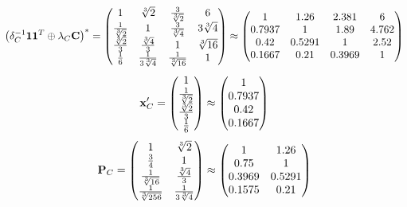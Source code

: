 \documentclass[10pt,a4paper]{article}
\begin{document}
	\[
		\left(\delta_{C}^{-1}\bold{11}^T \oplus \lambda_{C}\bold{C}\right)^* = 
		\begin{pmatrix}
			{1} {} & {\sqrt[3]{2}} {} & \frac{{3}} {\sqrt[3]{2}} & {{6}} {} \\
			\frac{1} {\sqrt[3]{2}} & {1} {} & \frac{{3}} {\sqrt[3]{4}} & {{3}\sqrt[3]{4}} {} \\
			\frac{\sqrt[3]{2}} {{3}} & \frac{\sqrt[3]{4}} {{3}} & {1} {} & {\sqrt[3]{16}} {} \\
			\frac{1} {{6}} & \frac{1} {{3}\sqrt[3]{4}} & \frac{1} {\sqrt[3]{16}} & {1} {} \\
		\end{pmatrix}
		\approx
		\begin{pmatrix}
			1        & 1.26     & 2.381    & 6        \\
			0.7937   & 1        & 1.89     & 4.762    \\
			0.42     & 0.5291   & 1        & 2.52     \\
			0.1667   & 0.21     & 0.3969   & 1        \\
		\end{pmatrix}
	\]
	\[
		\bold{x}'_{C} = 
		\begin{pmatrix}
			{1} {} \\
			\frac{1} {\sqrt[3]{2}} \\
			\frac{\sqrt[3]{2}} {{3}} \\
			\frac{1} {{6}} \\
		\end{pmatrix}
		\approx
		\begin{pmatrix}
			1        \\
			0.7937   \\
			0.42     \\
			0.1667   \\
		\end{pmatrix}
	\]
	\[
		\bold{P}_{C} = 
		\begin{pmatrix}
			{1} {} & {\sqrt[3]{2}} {} \\
			\frac{{3}} {{4}} & {1} {} \\
			\frac{1} {\sqrt[3]{16}} & \frac{\sqrt[3]{4}} {{3}} \\
			\frac{1} {\sqrt[3]{256}} & \frac{1} {{3}\sqrt[3]{4}} \\
		\end{pmatrix}
		\approx
		\begin{pmatrix}
			1        & 1.26     \\
			0.75     & 1        \\
			0.3969   & 0.5291   \\
			0.1575   & 0.21     \\
		\end{pmatrix}
	\]
\end{document}
